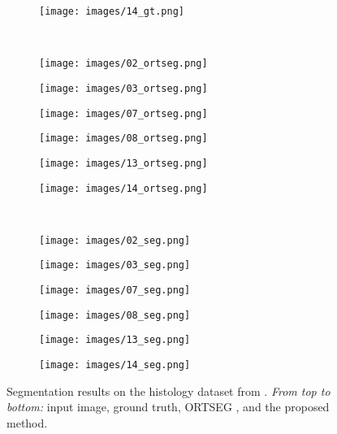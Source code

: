 \documentclass[journal]{IEEEtran}
\begin{document}
\begin{figure*}[!htbp]
\begin{subfigure}[b]{0.16\textwidth}
        \texttt{[image: images/14\_gt.png]}
    \end{subfigure}
    \\
    \vspace{1mm}
    \begin{subfigure}[b]{0.16\textwidth}
        \texttt{[image: images/02\_ortseg.png]}
    \end{subfigure}
    \hfill
    \begin{subfigure}[b]{0.16\textwidth}
        \texttt{[image: images/03\_ortseg.png]}
    \end{subfigure}
    \hfill
    \begin{subfigure}[b]{0.16\textwidth}
        \texttt{[image: images/07\_ortseg.png]}
    \end{subfigure}
    \hfill
    \begin{subfigure}[b]{0.16\textwidth}
        \texttt{[image: images/08\_ortseg.png]}
    \end{subfigure}
    \hfill
    \begin{subfigure}[b]{0.16\textwidth}
        \texttt{[image: images/13\_ortseg.png]}
    \end{subfigure}
    \hfill
    \begin{subfigure}[b]{0.16\textwidth}
        \texttt{[image: images/14\_ortseg.png]}
    \end{subfigure}
    \\
    \vspace{1mm}
    \begin{subfigure}[b]{0.16\textwidth}
        \texttt{[image: images/02\_seg.png]}
    \end{subfigure}
    \hfill
    \begin{subfigure}[b]{0.16\textwidth}
        \texttt{[image: images/03\_seg.png]}
    \end{subfigure}
    \hfill
    \begin{subfigure}[b]{0.16\textwidth}
        \texttt{[image: images/07\_seg.png]}
    \end{subfigure}
    \hfill
    \begin{subfigure}[b]{0.16\textwidth}
        \texttt{[image: images/08\_seg.png]}
    \end{subfigure}
    \hfill
    \begin{subfigure}[b]{0.16\textwidth}
        \texttt{[image: images/13\_seg.png]}
    \end{subfigure}
    \hfill
    \begin{subfigure}[b]{0.16\textwidth}
        \texttt{[image: images/14\_seg.png]}
    \end{subfigure}
    \caption{Segmentation results on the histology dataset from \cite{mccann2014}. \emph{From top to bottom:} input image, ground truth,  ORTSEG \cite{mccann2014}, and the proposed method.}
    \label{fig:histo_visual_results}
\end{figure*}
\end{document}
